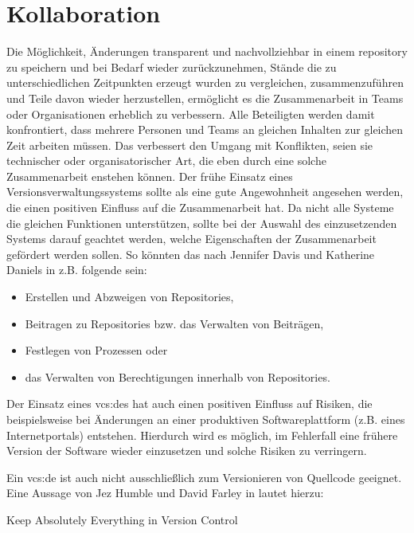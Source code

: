 \section{Kollaboration}\label{sec:collaboration}
Die Möglichkeit, Änderungen transparent und nachvollziehbar in einem
\gls{repository} zu speichern und bei Bedarf wieder zurückzunehmen, Stände die
zu unterschiedlichen Zeitpunkten erzeugt wurden zu vergleichen,
zusammenzuführen und Teile davon wieder herzustellen, ermöglicht es die
Zusammenarbeit in Teams oder Organisationen erheblich zu verbessern. Alle
Beteiligten werden damit konfrontiert, dass mehrere Personen und Teams an
gleichen Inhalten zur gleichen Zeit arbeiten müssen. Das verbessert den Umgang
mit Konflikten, seien sie technischer oder organisatorischer Art, die eben
durch eine solche Zusammenarbeit enstehen können. Der frühe Einsatz eines
Versionsverwaltungssystems sollte als eine gute Angewohnheit angesehen werden,
die einen positiven Einfluss auf die Zusammenarbeit hat. Da nicht alle Systeme
die gleichen Funktionen unterstützen, sollte bei der Auswahl des einzusetzenden
Systems darauf geachtet werden, welche Eigenschaften der Zusammenarbeit
gefördert werden sollen. So könnten das nach Jennifer Davis und Katherine
Daniels in \cite[S.~178]{effdo} z.B. folgende sein:

\begin{itemize}
\item Erstellen und Abzweigen von Repositories,
\item Beitragen zu Repositories bzw. das Verwalten von Beiträgen,
\item Festlegen von Prozessen oder
\item das Verwalten von Berechtigungen innerhalb von Repositories.
\end{itemize}

Der Einsatz eines \glspl{vcs:de} hat auch einen positiven Einfluss auf Risiken,
die beispielsweise bei Änderungen an einer produktiven Softwareplattform (z.B.
eines Internetportals) entstehen. Hierdurch wird es möglich, im Fehlerfall eine
frühere Version der Software wieder einzusetzen und solche Risiken zu
verringern.\cite[S.~178]{effdo}

Ein \acrlong{vcs:de} ist auch nicht ausschließlich zum Versionieren von Quellcode
geeignet. Eine Aussage von Jez Humble und David Farley in \cite[S.~33]{cd}
lautet hierzu:

\begin{center}
\glqq{}Keep Absolutely Everything in Version Control\grqq{}
\end{center}

